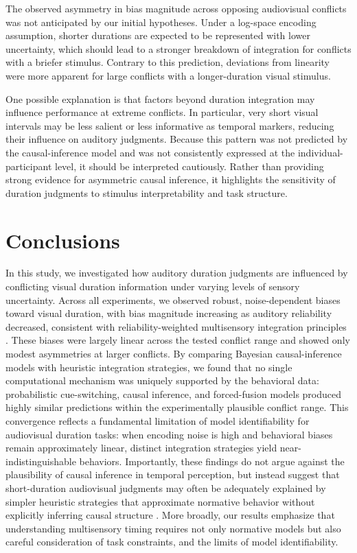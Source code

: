 \documentclass{jov}
\providecommand{\citep}[1]{\cite{#1}}
\begin{document}
The observed asymmetry in bias magnitude across opposing audiovisual conflicts was not anticipated by our initial hypotheses. Under a log-space encoding assumption, shorter durations are expected to be represented with lower uncertainty, which should lead to a stronger breakdown of integration for conflicts with a briefer stimulus. Contrary to this prediction, deviations from linearity were more apparent for large conflicts with a longer-duration visual stimulus.

One possible explanation is that factors beyond duration integration may influence performance at extreme conflicts. In particular, very short visual intervals may be less salient or less informative as temporal markers, reducing their influence on auditory judgments. Because this pattern was not predicted by the causal-inference model and was not consistently expressed at the individual-participant level, it should be interpreted cautiously. Rather than providing strong evidence for asymmetric causal inference, it highlights the sensitivity of duration judgments to stimulus interpretability and task structure.

\section{Conclusions}

In this study, we investigated how auditory duration judgments are influenced by conflicting visual duration information under varying levels of sensory uncertainty. Across all experiments, we observed robust, noise-dependent biases toward visual duration, with bias magnitude increasing as auditory reliability decreased, consistent with reliability-weighted multisensory integration principles \citep{ernst2002humans,van2008distortions,hartcher2014duration}. These biases were largely linear across the tested conflict range and showed only modest asymmetries at larger conflicts. By comparing Bayesian causal-inference models with heuristic integration strategies, we found that no single computational mechanism was uniquely supported by the behavioral data: probabilistic cue-switching, causal inference, and forced-fusion models produced highly similar predictions within the experimentally plausible conflict range. This convergence reflects a fundamental limitation of model identifiability for audiovisual duration tasks: when encoding noise is high and behavioral biases remain approximately linear, distinct integration strategies yield near-indistinguishable behaviors. Importantly, these findings do not argue against the plausibility of causal inference in temporal perception, but instead suggest that short-duration audiovisual judgments may often be adequately explained by simpler heuristic strategies that approximate normative behavior without explicitly inferring causal structure \citep{caruso2018single,laquitaine2018switching,ni2024computational}. More broadly, our results emphasize that understanding multisensory timing requires not only normative models but also careful consideration of task constraints, and the limits of model identifiability.
\end{document}
